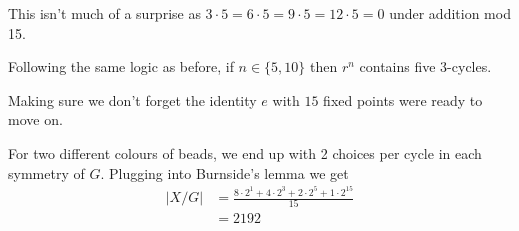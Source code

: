 \documentclass[../main.tex]{subfiles}
\begin{document}
    \begin{figure}[!htb]
        \captionsetup[subfigure]{labelformat=empty}
            \centering
            \label{steady_state}
    \end{figure}
    This isn't much of a surprise as $3 \cdot 5 = 6 \cdot 5 = 9 \cdot 5 = 12 \cdot 5 = 0$ under addition mod 15.
    
    Following the same logic as before, if $n \in \{5, 10\}$ then $r^n$ contains five 3-cycles. 
    
    Making sure we don't forget the identity $e$ with $15$ fixed points were ready to move on. 
    
    For two different colours of beads, we end up with 2 choices per cycle in each symmetry of $G$. Plugging into Burnside's lemma we get
    \begin{align*}
        \lvert X / G \rvert & = \frac{8 \cdot 2^1 + 4 \cdot 2^3 + 2 \cdot 2^5 + 1 \cdot 2^{15}}{15} \\
        & = 2192
    \end{align*}
    
\end{document}
